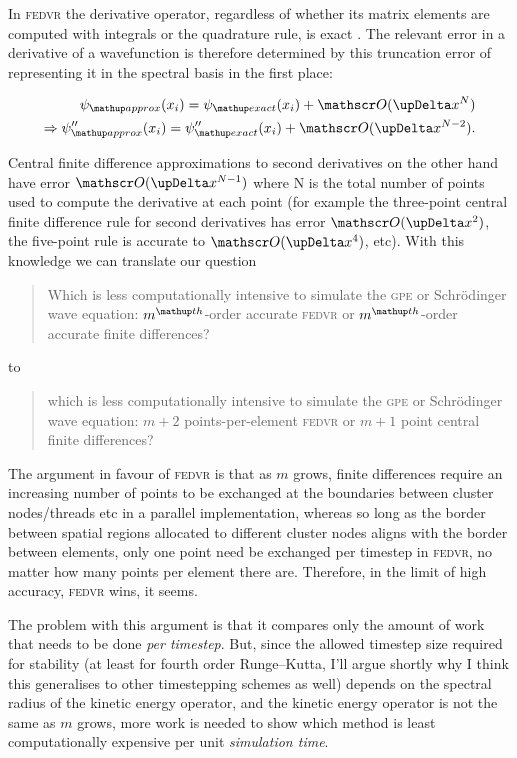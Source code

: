 In \textsc{fedvr} the derivative operator, regardless of whether its matrix elements are computed with integrals or the quadrature rule, is exact \cite{schneider_discrete_2005}. The relevant error in a derivative of a wavefunction is therefore determined by this truncation error of representing it in the spectral basis in the first place:

\begin{align}
\psi_\up{approx}(x_i) = \psi_\up{exact}(x_i) + \Ord{\upDelta x^N}\\
\Rightarrow\psi^{\prime \prime}_\up{approx}(x_i) =  \psi^{\prime\prime}_\up{exact}(x_i) + \Ord{\upDelta x^{N-2}}.
\end{align} 

Central finite difference approximations to second derivatives on the other hand have error $\Ord{\upDelta x^{N - 1}}$ where N is the total number of points used to compute the derivative at each point (for example the three-point central finite difference rule for second derivatives has error $\Ord{\upDelta x^2}$, the five-point rule is accurate to $\Ord{\upDelta x^4}$, etc). With this knowledge we can translate our question

\begin{quote}
Which is less computationally intensive to simulate the \textsc{gpe} or Schr\"odinger wave equation: $m^\up{th}$-order accurate \textsc{fedvr} or $m^\up{th}$-order accurate finite differences?
\end{quote}
to
\begin{quote}
which is less computationally intensive to simulate the \textsc{gpe} or Schr\"odinger wave equation: $m+2$ points-per-element \textsc{fedvr} or $m+1$ point central finite differences?
\end{quote}
The argument in favour of \textsc{fedvr} is that as $m$ grows, finite differences require an increasing number of points to be exchanged at the boundaries between cluster nodes/threads etc in a parallel implementation, whereas so long as the border between spatial regions allocated to different cluster nodes aligns with the border between elements, only one point need be exchanged per timestep in \textsc{fedvr}, no matter how many points per element there are. Therefore, in the limit of high accuracy, \textsc{fedvr} wins, it seems.

The problem with this argument is that it compares only the amount of work that needs to be done \emph{per timestep}. But, since the allowed timestep size required for stability (at least for fourth order Runge--Kutta, I'll argue shortly why I think this generalises to other timestepping schemes as well) depends on the spectral radius of the kinetic energy operator, and the kinetic energy operator is not the same as $m$ grows, more work is needed to show which method is least computationally expensive per unit \emph{simulation time}.

